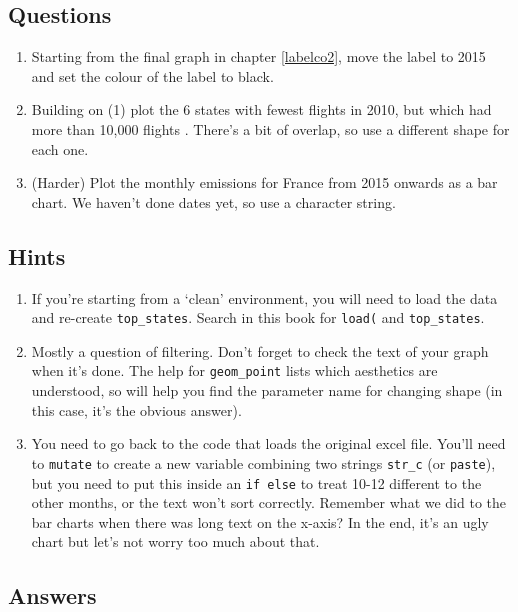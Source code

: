 \documentclass[
]{book}
\providecommand{\tightlist}{%
  \setlength{\itemsep}{0pt}\setlength{\parskip}{0pt}}
\begin{document}
\hypertarget{questions-4}{%
\subsection{Questions}\label{questions-4}}

\begin{enumerate}
\def\labelenumi{\arabic{enumi})}
\tightlist
\item
  Starting from the final graph in chapter \ref{labelco2}, move the label to 2015 and set the colour of the label to black.
\item
  Building on (1) plot the 6 states with fewest flights in 2010, but which had more than 10,000 flights . There's a bit of overlap, so use a different shape for each one.
\item
  (Harder) Plot the monthly emissions for France from 2015 onwards as a bar chart. We haven't done dates yet, so use a character string.
\end{enumerate}

\hypertarget{co2hints}{%
\subsection{Hints}\label{co2hints}}

\begin{enumerate}
\def\labelenumi{\arabic{enumi})}
\tightlist
\item
  If you're starting from a `clean' environment, you will need to load the data and re-create \texttt{top\_states}. Search in this book for \texttt{load(} and \texttt{top\_states}.
\item
  Mostly a question of filtering. Don't forget to check the text of your graph when it's done. The help for \texttt{geom\_point} lists which aesthetics are understood, so will help you find the parameter name for changing shape (in this case, it's the obvious answer).
\item
  You need to go back to the code that loads the original excel file. You'll need to \texttt{mutate} to create a new variable combining two strings \texttt{str\_c} (or \texttt{paste}), but you need to put this inside an \texttt{if\ else} to treat 10-12 different to the other months, or the text won't sort correctly. Remember what we did to the bar charts when there was long text on the x-axis?
  In the end, it's an ugly chart but let's not worry too much about that.
\end{enumerate}

\hypertarget{answers-4}{%
\subsection{Answers}\label{answers-4}}
\end{document}
